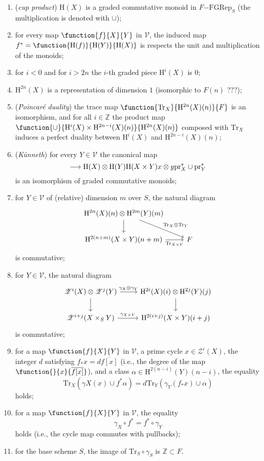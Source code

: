 \documentclass[a4paper,10pt]{article}
\def\basepieces{\mathscr{V}}
\def\smpr{\mathrm{SmPr}}
\newcommand{\fgrep}[2]{#1\mathrm{-FGRep}_{#2}}
\def\coh{\mathrm{H}}
\def\tensor{\otimes}
\def\pr{\mathrm{pr}}
\def\cyc{\mathscr{Z}}
\def\Tr{\mathrm{Tr}}
\begin{document}
\begin{enumerate}[label=(C\arabic*)] %
	\item (\emph{cup product}) $\coh(X)$ is a graded commutative monoid in
		$\fgrep{F}{S}$ (the multiplication is denoted with $\cup$);
	\item for every map $\function{f}{X}{Y}$ in $\basepieces$, the induced
		map $f^{*} = \function{\coh(f)}{\coh(Y)}{\coh(X)}$ is respects
		the unit and multiplication of the monoids;
	\item for $i < 0$ and for $i > 2n$ the $i$-th graded piece
		$\coh^{i}(X)$ is $0$;
	\item $\coh^{2n}(X)$ is a representation of dimension $1$ (isomorphic
		to $F(n)$ ???);
	\item (\emph{Poincar\'{e} duality}) the trace map
		$\function{\Tr_{X}}{\coh^{2n}(X)(n)}{F}$ is an isomorphism, and
		for all $i \in \mathbb{Z}$ the product map
		$\function{\cup}{\coh^{i}(X) \times
		\coh^{2n-i}(X)(n)}{\coh^{2n}(X)(n)}$ composed with $\Tr_{X}$
		induces a perfect duality between $\coh^{i}(X)$ and
		$\coh^{2n-i}(X)(n)$;
	\item (\emph{K\"{u}nneth}) for every $Y \in \basepieces$
		the canonical map
		\[
			\map{}{\coh(X) \tensor \coh(Y)}{\coh(X \times Y)}%
			{x \tensor y}{\pr_{X}^{*} \cup \pr_{Y}^{*}}
		\]
		is an isomorphism of graded commutative monoids;
	\item for $Y \in \basepieces$ of (relative) dimension $m$ over $S$, the
		natural diagram
		\[ \begin{tikzcd} %
			\coh^{2n}(X)(n) \tensor \coh^{2m}(Y)(m)
			\drar{\Tr_{X} \tensor \Tr_{Y}}
			\dar{} & \\
			\coh^{2(n+m)}(X \times Y)(n+m)
			\rar[swap]{\Tr_{X \times Y}} &
			F
		\end{tikzcd} \] %
		is commutative;
	\item for $Y \in \basepieces$, the natural diagram
		\[ \begin{tikzcd} %
			\cyc^{i}(X) \tensor \cyc^{j}(Y) \dar
			\rar{\gamma_{X} \tensor \gamma_{Y}} &
			\coh^{2i}(X)(i) \tensor \coh^{2j}(Y)(j) \dar \\
			\cyc^{i+j}(X \times_{S} Y) \rar{\gamma_{X \times Y}} &
			\coh^{2(i+j)}(X \times Y)(i+j)
		\end{tikzcd} \] %
		is commutative;
	\item for a map $\function{f}{X}{Y}$ in $\basepieces$, a prime cycle
		$x \in \cyc^{i}(X)$, the integer $d$ satisfying $f_{*}x =
		d\overline{f[x]}$ (i.e., the degree of the map
		$\function{}{x}{\overline{f[x]}}$), and a class $\alpha \in
		\coh^{2(n-i)}(Y)(n-i)$, the equality
		\[
			\Tr_{X}(\gamma{X}(x) \cup f^{*}\alpha) =
			d\Tr_{Y}(\gamma_{Y}(f_{*}x) \cup \alpha)
		\]
		holds;
	\item for a map $\function{f}{X}{Y}$ in $\basepieces$, the equality
		\[
			\gamma_{X} \circ f^{*} = f^{*} \circ \gamma_{Y}
		\]
		holds (i.e., the cycle map commutes with pullbacks);
	\item for the base scheme $S$, the image of $\Tr_{S} \circ \gamma_{S}$
		is $\mathbb{Z} \subset F$.
\end{enumerate} %
\end{document}
